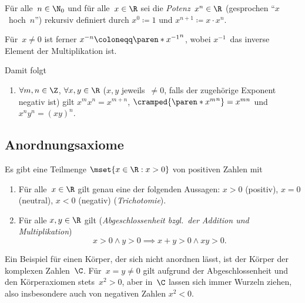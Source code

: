 \documentclass[a4paper]{article}
\begin{document}
\begin{definition}[Potenz]
    Für alle~$n \in \N_0$ und für alle~$x \in \R$ sei die \emph{Potenz}~$x^n \in \R$ (gesprochen "`$x$~hoch~$n$"') rekursiv definiert durch $x^0 \coloneqq 1$ und $x^{n+1} \coloneqq x \cdot x^n$.

    Für~$x \neq 0$ ist ferner $x^{-n} \coloneqq \paren*{x^{-1}}^n$, wobei $x^{-1}$~das inverse Element der Multiplikation ist.
\end{definition}

Damit folgt
\begin{enumerate}[resume*=conclusions]
    \item $\forall m, n \in \Z$, $\forall x, y \in \R$ ($x, y$ jeweils~$\neq 0$, falls der zugehörige Exponent negativ ist) gilt $x^m x^n = x^{m+n}$, $\cramped{\paren*{x^m}^n} = x^{mn}$ und $x^n y^n = (xy)^n$.
\end{enumerate}

\subsection{Anordnungsaxiome}

\begin{axiom}[Anordnungsaxiome]
    Es gibt eine Teilmenge $\mset{x \in \R : x > 0}$ von positiven Zahlen mit
    \begin{enumerate}[resume*=axioms]
        \item Für alle~$x \in \R$ gilt genau eine der folgenden Aussagen: $x > 0$ (positiv), $x = 0$ (neutral), $x < 0$ (negativ) (\emph{Trichotomie}).
        \item Für alle $x, y \in \R$ gilt (\emph{Abgeschlossenheit bzgl.\ der Addition und Multiplikation})
              \begin{equation*}
                  x > 0 \wedge y > 0 \implies x + y > 0 \wedge x y > 0.
              \end{equation*}\label{ax:oc}
    \end{enumerate}
\end{axiom}

Ein Beispiel für einen Körper, der sich nicht anordnen lässt, ist der Körper der komplexen Zahlen~$\C$. Für~$x = y \neq 0$ gilt aufgrund der Abgeschlossenheit und den Körperaxiomen stets~$x^2 > 0$, aber in~$\C$ lassen sich immer Wurzeln ziehen, also insbesondere auch von negativen Zahlen $x^2 < 0$.
\end{document}
